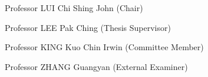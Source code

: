 \noindent Professor LUI Chi Shing John (Chair)

\noindent Professor LEE Pak Ching (Thesis Supervisor)

\noindent Professor KING Kuo Chin Irwin (Committee Member)

\noindent Professor ZHANG Guangyan (External Examiner)
